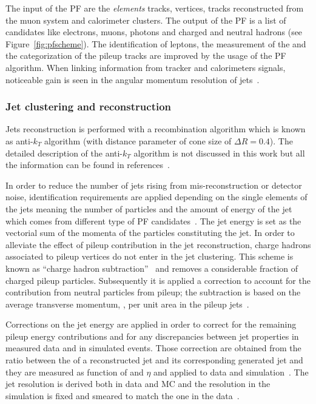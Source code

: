 The input of the PF are the \emph{elements} tracks, vertices, tracks
reconstructed from the muon system and
calorimeter clusters. The output of the PF is a list of candidates
like electrons, muons, photons and charged and neutral hadrons (see
Figure~\ref{fig:pfscheme}). The identification of leptons, the
measurement of the \ptmiss and the categorization of the pileup tracks
are improved by the usage of the PF algorithm. When linking
information from tracker and calorimeters signals, noticeable gain is seen
in the angular momentum resolution of jets~\cite{CMS:particleflow}.

\subsubsection{Jet clustering and reconstruction}\label{sec:jetclustering}
Jets reconstruction is performed with a recombination algorithm which
is known as anti-$k_T$ algorithm (with distance parameter of cone size
of $\Delta R = 0.4$). The detailed description of the anti-$k_T$ algorithm is not
discussed in this work but all the information can be found in 
references~\cite{Cacciari_2008,Cacciari_2012}.

In order to reduce the number of jets rising from mis-reconstruction or
detector noise, identification requirements are applied depending on the single elements of the
jets meaning the number of particles and the amount of energy of the
jet which comes from different type of PF candidates~\cite{CMS-PAS-JME-16-003}.
The jet energy is set as the vectorial sum of the momenta of the
particles constituting the jet. In order to alleviate the effect of
pileup contribution in the jet reconstruction, charge hadrons
associated to pileup vertices do not enter in the jet clustering. This
scheme is known as ``charge hadron
subtraction''~\cite{CMS-PAS-JME-14-001} and removes a
considerable fraction of charged pileup particles.  
Subsequently it is applied a correction to account for the
contribution from neutral particles from pileup; the subtraction is
based on the average transverse momentum, \pt, per unit area in the
pileup jets~\cite{CACCIARI2008119, Cacciari_2008_area,
  Sirunyan:2020foa}.

Corrections on the jet energy are applied in order to correct for the
remaining pileup energy contributions and for any discrepancies
between jet properties in measured data and in simulated events. Those
correction are obtained from the ratio between the \pt of a
reconstructed jet and its corresponding generated jet and they are
measured as function of \pt and $\eta$ and applied to data and
simulation~\cite{Khachatryan_2017}. The jet \pt resolution is
derived both in data and MC and the resolution in the simulation is
fixed and smeared to match the one in the
data~\cite{Khachatryan_2017}.

